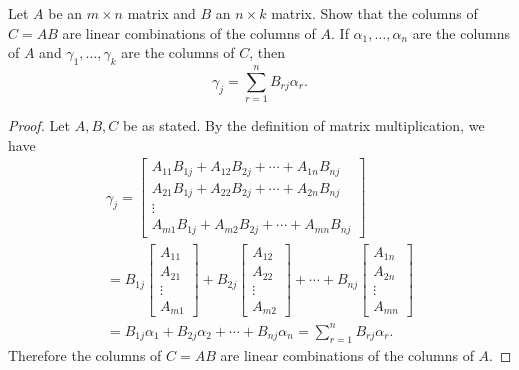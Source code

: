  Let $A$ be an $m\times n$ matrix and $B$ an $n\times k$
matrix. Show that the columns of $C = AB$ are linear combinations of
the columns of $A$. If $\alpha_1,\dots,\alpha_n$ are the columns of
$A$ and $\gamma_1,\dots,\gamma_k$ are the columns of $C$, then
\begin{equation*}
  \gamma_j = \sum_{r=1}^nB_{rj}\alpha_r.
\end{equation*}
\begin{proof}
  Let $A,B,C$ be as stated. By the definition of matrix
  multiplication, we have
  \begin{multline*}
    \gamma_j =
    \begin{bmatrix}
      A_{11}B_{1j} + A_{12}B_{2j} + \cdots + A_{1n}B_{nj} \\
      A_{21}B_{1j} + A_{22}B_{2j} + \cdots + A_{2n}B_{nj} \\
      \vdots \\
      A_{m1}B_{1j} + A_{m2}B_{2j} + \cdots + A_{mn}B_{nj}
    \end{bmatrix} \\
    = B_{1j}
    \begin{bmatrix}
      A_{11} \\
      A_{21} \\
      \vdots \\
      A_{m1}
    \end{bmatrix}
    + B_{2j}
    \begin{bmatrix}
      A_{12} \\
      A_{22} \\
      \vdots \\
      A_{m2}
    \end{bmatrix}
    + \cdots + B_{nj}
    \begin{bmatrix}
      A_{1n} \\
      A_{2n} \\
      \vdots \\
      A_{mn}
    \end{bmatrix} \\
    = B_{1j}\alpha_1 + B_{2j}\alpha_2 + \cdots + B_{nj}\alpha_n =
    \sum_{r=1}^nB_{rj}\alpha_r.
  \end{multline*}
  Therefore the columns of $C = AB$ are linear combinations of the
  columns of $A$.
\end{proof}
